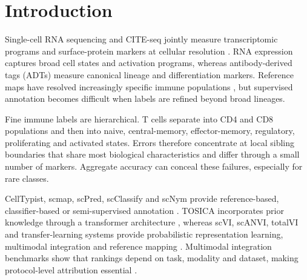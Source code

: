 \documentclass[unnumsec,webpdf,contemporary,large,numbered]{oup-authoring-template}
\begin{document}

\maketitle

\section{Introduction}

Single-cell RNA sequencing and CITE-seq jointly measure transcriptomic programs and surface-protein markers at cellular resolution \citep{satija2015,butler2018,stuart2019,hao2021,stoeckius2017cite,luecken2019}. RNA expression captures broad cell states and activation programs, whereas antibody-derived tags (ADTs) measure canonical lineage and differentiation markers. Reference maps have resolved increasingly specific immune populations \citep{villani2017,triana2021}, but supervised annotation becomes difficult when labels are refined beyond broad lineages.

Fine immune labels are hierarchical. T cells separate into CD4 and CD8 populations and then into naive, central-memory, effector-memory, regulatory, proliferating and activated states. Errors therefore concentrate at local sibling boundaries that share most biological characteristics and differ through a small number of markers. Aggregate accuracy can conceal these failures, especially for rare classes.

CellTypist, scmap, scPred, scClassify and scNym provide reference-based, classifier-based or semi-supervised annotation \citep{aran2019,kiselev2018scmap,alquicira2020scpred,lin2020scclassify,kimmel2021scnym,dominguezconde2022,abdelaal2019}. TOSICA incorporates prior knowledge through a transformer architecture \citep{chen2023tosica}, whereas scVI, scANVI, totalVI and transfer-learning systems provide probabilistic representation learning, multimodal integration and reference mapping \citep{lopez2018,xu2021scvi,gayoso2021totalvi,gayoso2022scvi,lotfollahi2022}. Multimodal integration benchmarks show that rankings depend on task, modality and dataset, making protocol-level attribution essential \citep{haghverdi2018,korsunsky2019,luecken2022,argelaguet2021,liu2025multitaskbenchmark}.
\end{document}
